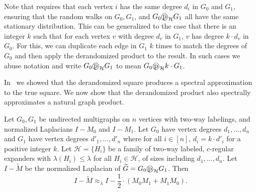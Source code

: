 \documentclass{toc}
\newcommand{\wt}{\widetilde}   %
\newcommand{\dpr}{\text{\textcircled{p}}_{\mathcal{H}}}
\numberwithin{myalgctr}{section}
\theoremstyle{named}
\begin{document}
Note that  requires that each vertex $i$ has the same degree $d_i$ in $G_0$ and $G_1$, ensuring that the random walks on $G_0,G_1$, and $G_0\dpr G_1$ all have the same stationary distribution. This can be generalized to the case that there is an integer $k$ such that for each vertex $v$ with degree $d_v$ in $G_1$, $v$ has degree $k\cdot d_v$ in $G_0$. For this, we can duplicate each edge in $G_1$ $k$ times to match the degrees of $G_0$ and then apply the derandomized product to the result. In such cases we abuse notation and write $G_0\dpr G_1$ to mean $G_0\dpr k\cdot G_1$.  

In~\cite{derandbeyond2017} we showed that the derandomized square produces a spectral approximation to the true square. We now show that the derandomized product also spectrally approximates a natural graph product. 

\begin{theorem}
\label{thm:dprapprox}
Let $G_0,G_1$ be undirected multigraphs on $n$ vertices with two-way labelings, and normalized Laplacians $I-M_0$ and $I-M_1$. Let $G_0$ have vertex degrees $d_1,\ldots,d_n$ and $G_1$ have vertex degrees $d'_1,\ldots,d'_n$ where for all $i\in[n]$, $d_i=k\cdot d'_i$ for a positive integer $k$. Let $\mathcal{H}=\{H_i\}$ be a family of two-way labeled, $c$-regular expanders with $\lambda(H_i)\leq\lambda$ for all $H_i\in\mathcal{H}$, of sizes including $d_1,\ldots,d_n$. Let $I-\wt{M}$ be the normalized Laplacian of $\wt{G}=G_0\dpr G_1$. Then
\[
I-\wt{M}\approx_{\lambda} I-\frac{1}{2}\cdot(M_0M_1+M_1M_0).
\]
\end{theorem}
\end{document}
